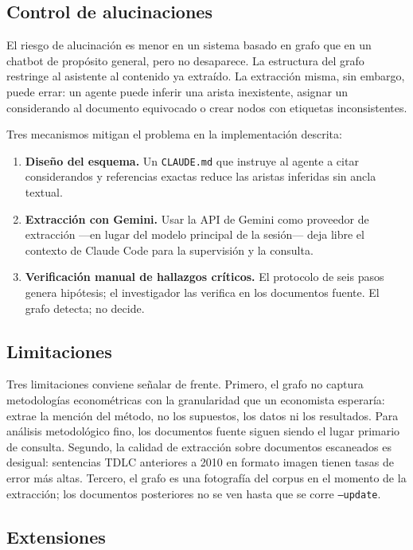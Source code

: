 \documentclass[12pt,a4paper]{article}
\begin{document}
\subsection{Control de alucinaciones}

El riesgo de alucinación es menor en un sistema basado en grafo que en un
chatbot de propósito general, pero no desaparece. La estructura del grafo
restringe al asistente al contenido ya extraído. La extracción misma, sin
embargo, puede errar: un agente puede inferir una arista inexistente, asignar un
considerando al documento equivocado o crear nodos con etiquetas inconsistentes.

Tres mecanismos mitigan el problema en la implementación descrita:

\begin{enumerate}
  \item \textbf{Diseño del esquema.} Un \texttt{CLAUDE.md} que instruye al
    agente a citar considerandos y referencias exactas reduce las aristas
    inferidas sin ancla textual.
  \item \textbf{Extracción con Gemini.} Usar la API de Gemini como proveedor de
    extracción —en lugar del modelo principal de la sesión— deja libre el
    contexto de Claude Code para la supervisión y la consulta.
  \item \textbf{Verificación manual de hallazgos críticos.} El protocolo de seis
    pasos genera hipótesis; el investigador las verifica en los documentos
    fuente. El grafo detecta; no decide.
\end{enumerate}

\subsection{Limitaciones}

Tres limitaciones conviene señalar de frente. Primero, el grafo no captura
metodologías econométricas con la granularidad que un economista esperaría:
extrae la mención del método, no los supuestos, los datos ni los resultados.
Para análisis metodológico fino, los documentos fuente siguen siendo el lugar
primario de consulta. Segundo, la calidad de extracción sobre documentos
escaneados es desigual: sentencias TDLC anteriores a 2010 en formato imagen
tienen tasas de error más altas. Tercero, el grafo es una fotografía del corpus
en el momento de la extracción; los documentos posteriores no se ven hasta que
se corre \texttt{--update}.

\subsection{Extensiones}
\end{document}
